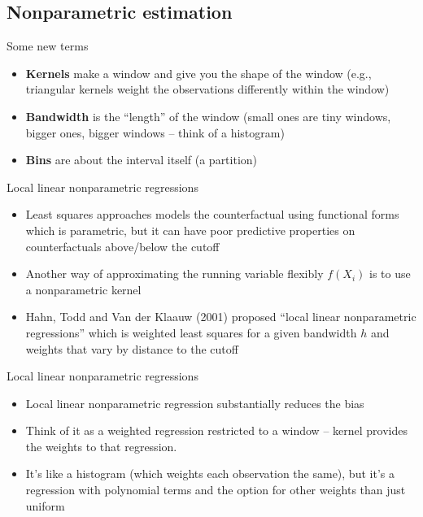 \documentclass{beamer}
\begin{document}
\subsection{Nonparametric estimation}

\begin{frame}{Some new terms}

\begin{itemize}

\item \textbf{Kernels} make a window and give you the shape of the window (e.g., triangular kernels weight the observations differently within the window)
\item \textbf{Bandwidth} is the ``length'' of the window (small ones are tiny windows, bigger ones, bigger windows -- think of a histogram)
\item \textbf{Bins} are about the interval itself (a partition)

\end{itemize}

\end{frame}




\begin{frame}{Local linear nonparametric regressions}

\begin{itemize}
\item Least squares approaches models the counterfactual using functional forms which is parametric, but it can have poor predictive properties on counterfactuals above/below the cutoff
\item Another way of approximating the running variable flexibly $f(X_i)$ is to use a nonparametric kernel 
\item Hahn, Todd and Van der Klaauw (2001) proposed ``local linear nonparametric regressions'' which is weighted least squares for a given bandwidth $h$ and weights that vary by distance to the cutoff
\end{itemize}

\end{frame}



\begin{frame}{Local linear nonparametric regressions}
	
	\begin{itemize}
	\item Local linear nonparametric regression substantially reduces the bias
	\item Think of it as a weighted regression restricted to a window -- kernel provides the weights to that regression.  
	\item It's like a histogram (which weights each observation the same), but it's a regression with polynomial terms and the option for other weights than just uniform
	\end{itemize}
	
\end{frame}
\end{document}
